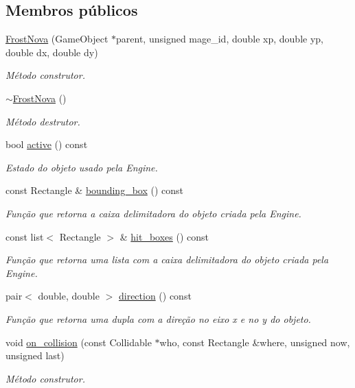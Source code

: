 \subsection*{Membros públicos}
\begin{DoxyCompactItemize}
\item 
\mbox{\hyperlink{classFrostNova_aae4bca356b3b1439c74fc259e5fb601d}{Frost\+Nova}} (Game\+Object $\ast$parent, unsigned mage\+\_\+id, double xp, double yp, double dx, double dy)
\begin{DoxyCompactList}\small\item\em Método construtor. \end{DoxyCompactList}\item 
\mbox{\label{classFrostNova_aabe26c8431c96cbdaec1c2b1a5f2fc24}} 
\mbox{\hyperlink{classFrostNova_aabe26c8431c96cbdaec1c2b1a5f2fc24}{$\sim$\+Frost\+Nova}} ()
\begin{DoxyCompactList}\small\item\em Método destrutor. \end{DoxyCompactList}\item 
bool \mbox{\hyperlink{classFrostNova_ad294037668fc3609c127c1e69031865b}{active}} () const
\begin{DoxyCompactList}\small\item\em Estado do objeto usado pela Engine. \end{DoxyCompactList}\item 
const Rectangle \& \mbox{\hyperlink{classFrostNova_a4d70c5ea288631e425dadcf5e479a1b6}{bounding\+\_\+box}} () const
\begin{DoxyCompactList}\small\item\em Função que retorna a caixa delimitadora do objeto criada pela Engine. \end{DoxyCompactList}\item 
const list$<$ Rectangle $>$ \& \mbox{\hyperlink{classFrostNova_aa0dd4571d7eb64ee7270f2afb972b410}{hit\+\_\+boxes}} () const
\begin{DoxyCompactList}\small\item\em Função que retorna uma lista com a caixa delimitadora do objeto criada pela Engine. \end{DoxyCompactList}\item 
pair$<$ double, double $>$ \mbox{\hyperlink{classFrostNova_a9ec9aeb096b42670bf640ea47f27fd84}{direction}} () const
\begin{DoxyCompactList}\small\item\em Função que retorna uma dupla com a direção no eixo x e no y do objeto. \end{DoxyCompactList}\item 
void \mbox{\hyperlink{classFrostNova_aeda0ee508c08250e8e36a9a0f2c24d96}{on\+\_\+collision}} (const Collidable $\ast$who, const Rectangle \&where, unsigned now, unsigned last)
\begin{DoxyCompactList}\small\item\em Método construtor. \end{DoxyCompactList}\end{DoxyCompactItemize}

